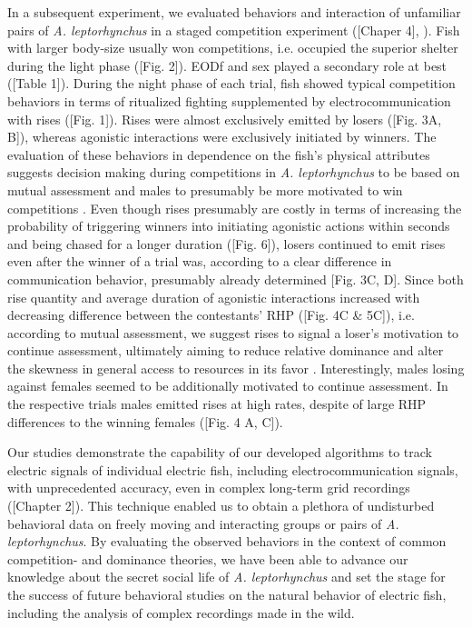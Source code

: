 \documentclass[11pt,pdftex]{article}
\newcommand{\note}[2][]{\textcolor{red!80!black}{[\textbf{\ifthenelse{\equal{#1}{}}{}{#1: }}#2]}}
\newcommand{\notetr}[1]{\note[TR]{#1}}
\newcommand{\lepto}{\textit{A. leptorhynchus}}
\begin{document}
In a subsequent experiment, we evaluated behaviors and interaction of unfamiliar pairs of \lepto{} in a staged competition experiment (\notetr{Chaper 4}, \citealp{Raab2021}). Fish with larger body-size usually won competitions, i.e. occupied the superior shelter during the light phase (\notetr{Fig. 2}). EODf and sex played a secondary role at best (\notetr{Table 1}). During the night phase of each trial, fish showed typical competition behaviors in terms of ritualized fighting supplemented by electrocommunication with rises (\notetr{Fig. 1}). Rises were almost exclusively emitted by losers (\notetr{Fig. 3A, B}), whereas agonistic interactions were exclusively initiated by winners. The evaluation of these behaviors in dependence on the fish's physical attributes suggests decision making during competitions in \lepto{} to be based on mutual assessment \citep{EnquistLeimar1987} and males to presumably be more motivated to win competitions \citep{ArnottElwood2008}. Even though rises presumably are costly in terms of increasing the probability of triggering winners into initiating agonistic actions within seconds and being chased for a longer duration (\notetr{Fig. 6}), losers continued to emit rises even after the winner of a trial was, according to a clear difference in communication behavior, presumably already determined \notetr{Fig. 3C, D}. Since both rise quantity and average duration of agonistic interactions increased with decreasing difference between the contestants' RHP (\notetr{Fig. 4C \& 5C}), i.e. according to mutual assessment, we suggest rises to signal a loser's motivation to continue assessment, ultimately aiming to reduce relative dominance and alter the skewness in general access to resources in its favor \citep{Sapolsky2005}. Interestingly, males losing against females seemed to be additionally motivated to continue assessment. In the respective trials males emitted rises at high rates, despite of large RHP differences to the winning females (\notetr{Fig. 4 A, C}).

Our studies demonstrate the capability of our developed algorithms to track electric signals of individual electric fish, including electrocommunication signals, with unprecedented accuracy, even in complex long-term grid recordings (\notetr{Chapter 2}). This technique enabled us to obtain a plethora of undisturbed behavioral data on freely moving and interacting groups or pairs of \lepto{}. By evaluating the observed behaviors in the context of common competition- and dominance theories, we have been able to advance our knowledge about the secret social life of \lepto{} and set the stage for the success of future behavioral studies on the natural behavior of electric fish, including the analysis of complex recordings made in the wild. 
\end{document}

